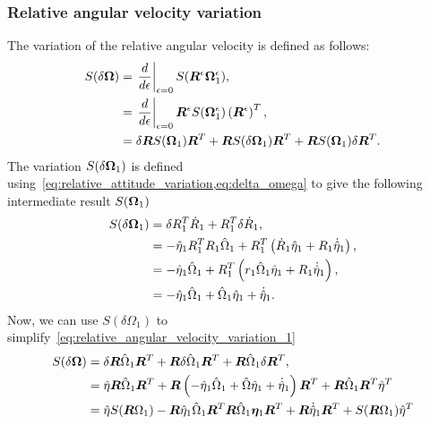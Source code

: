 \subsubsection{Relative angular velocity variation}
The variation of the relative angular velocity is defined as follows:
\begin{align}\label{eq:relative_angular_velocity_variation_1}
    S(\delta \bm{\Omega}) &= \left. \frac{d }{d \epsilon} \right|_{\epsilon=0} S(\bm{R}^\epsilon  \bm{\Omega}^\epsilon_1) , \nonumber\\
    &= \left. \frac{d }{d \epsilon} \right|_{\epsilon=0} \bm{R}^\epsilon S(\bm{\Omega}^\epsilon_1)  \left( \bm{R}^\epsilon \right)^T, \nonumber\\
    &= \delta \bm{R} S(\bm{\Omega}_1) \bm{R}^T  + \bm{R} S(\delta \bm{\Omega}_1) \bm{R}^T + \bm{R} S(\bm{\Omega}_1) \delta \bm{R}^T .
\end{align}
The variation \( S(\delta \bm{\Omega}_1)\) is defined using~\cref{eq:relative_attitude_variation,eq:delta_omega} to give the following intermediate result \(S(\bm{\Omega}_1)\)
\begin{align*}
    S(\delta \bm{\Omega}_1) &= \delta R_1^T \dot{R}_1 + R_1^T \delta \dot{R}_1 , \\
                            &= -\hat{\eta}_1 R_1^T R_1 \hat{\Omega}_1 + R_1^T \left( \dot{R}_1 \hat{\eta}_1 + R_1 \dot{\hat{\eta}}_1 \right) , \\
                            &= -\hat{\eta}_1 \hat{\Omega}_1 + R_1^T \left( r_1 \hat{\Omega}_1 \hat{\eta}_1 + R_1 \dot{\hat{\eta}}_1  \right) , \\
                            &= - \hat{\eta}_1 \hat{\Omega}_1 + \hat{\Omega}_1 \hat{\eta}_1 + \dot{\hat{\eta}}_1 .
\end{align*}
Now, we can use \(S(\delta \Omega_1) \) to simplify~\cref{eq:relative_angular_velocity_variation_1}
\begin{align}\label{eq:relative_angular_velocity_variation_2}
    S(\delta \bm{\Omega}) &= \delta \bm{R} \hat{\Omega}_1 \bm{R}^T + \bm{R} \hat{\delta \Omega_1} \bm{R}^T + \bm{R} \hat{\Omega}_1 \delta \bm{R}^T , \\
                          &= \hat{\eta} \bm{R} \hat{\Omega}_1 \bm{R}^T + \bm{R} \left( -\hat{\eta}_1 \hat{\Omega}_1 + \hat{\Omega} \hat{\eta}_1 + \dot{\hat{\eta}}_1 \right) \bm{R}^T + \bm{R} \hat{\Omega}_1 \bm{R}^T \hat{\eta}^T \\
                          &= \hat{\eta} S(\bm{R} \Omega_1) - \bm{R} \hat{\eta}_1 \hat{\Omega}_1 \bm{R}^T \bm{R} \hat{\Omega}_1 \bm{\eta}_1 \bm{R}^T + \bm{R} \dot{\hat{\eta}}_1 \bm{R}^T + S(\bm{R}\Omega_1) \hat{\eta}^T
\end{align}
